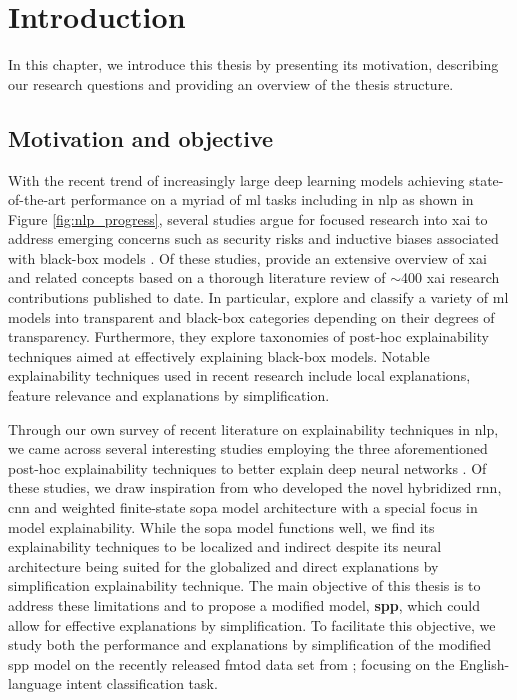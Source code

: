 \chapter{Introduction}

\label{chapter:introduction}

In this chapter, we introduce this thesis by presenting its motivation,
describing our research questions and providing an overview of the thesis
structure.

\section{Motivation and objective}

With the recent trend of increasingly large deep learning models achieving
state-of-the-art performance on a myriad of \ac{ml} tasks including in \ac{nlp}
as shown in Figure \ref{fig:nlp_progress}, several studies argue for focused
research into \ac{xai} to address emerging concerns such as security risks and
inductive biases associated with black-box models
\citep{doran2017does,townsend2019extracting,danilevsky2020survey,arrieta2020explainable}.
Of these studies, \citet{arrieta2020explainable} provide an extensive overview
of \ac{xai} and related concepts based on a thorough literature review of
$\sim$400 \ac{xai} research contributions published to date. In particular,
\citet{arrieta2020explainable} explore and classify a variety of
\ac{ml} models into transparent and black-box categories depending on
their degrees of transparency. Furthermore, they explore taxonomies of post-hoc
explainability techniques aimed at effectively explaining black-box models.
Notable explainability techniques used in recent research include local
explanations, feature relevance and explanations by simplification.

Through our own survey of recent literature on explainability techniques in
\ac{nlp}, we came across several interesting studies employing the three
aforementioned post-hoc explainability techniques to better explain deep neural networks
\citep{schwartz2018sopa,peng2018rational,suresh-etal-2019-distilling,wang2019state,jiang2020cold}.
Of these studies, we draw inspiration from \citet{schwartz2018sopa} who
developed the novel hybridized \ac{rnn}, \ac{cnn} and weighted finite-state
\ac{sopa} model architecture with a special focus in model explainability. While
the \ac{sopa} model functions well, we find its explainability techniques to be
localized and indirect despite its neural architecture being suited for the
globalized and direct explanations by simplification explainability technique.
The main objective of this thesis is to address these limitations and to propose
a modified model, \textbf{\ac{spp}}, which could allow for effective explanations
by simplification. To facilitate this objective, we study both the performance and
explanations by simplification of the modified \ac{spp} model on the recently
released \ac{fmtod} data set from \citet{schuster-etal-2019-cross-lingual};
focusing on the English-language intent classification task.

